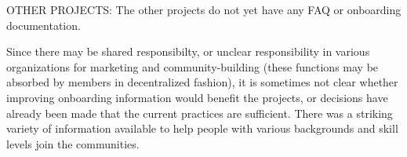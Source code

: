 OTHER PROJECTS: The other projects do not yet have any FAQ or onboarding documentation.

Since there may be shared responsibilty, or unclear responsibility in various organizations for marketing and community-building (these functions may be absorbed by members in decentralized fashion), it is sometimes not clear whether improving onboarding information would benefit the projects, or decisions have already been made that the current practices are sufficient. There was a striking variety of information available to help people with various backgrounds and skill levels join the communities. 





